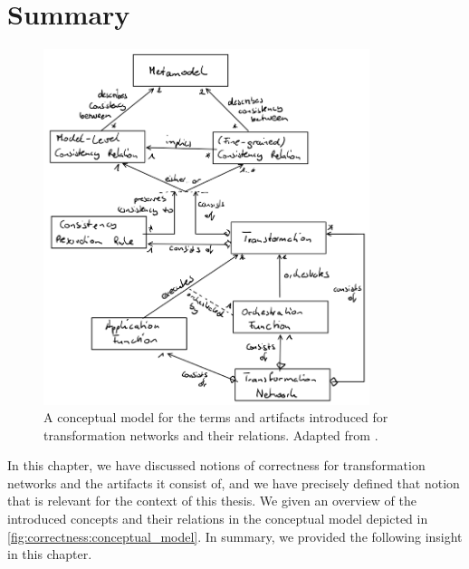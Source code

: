 \section{Summary}
\label{chap:correctness:summary}


\begin{figure}
    \centering
    \includegraphics[width=0.85\textwidth]{figures/correctness/notion/conceptual_model.png}
    \caption[Conceptual model for transformation networks]{A conceptual model for the terms and artifacts introduced for transformation networks and their relations. Adapted from .}
    \label{fig:correctness:conceptual_model}
\end{figure}

In this chapter, we have discussed notions of correctness for transformation networks and the artifacts it consist of, and we have precisely defined that notion that is relevant for the context of this thesis.
We given an overview of the introduced concepts and their relations in the conceptual model depicted in \autoref{fig:correctness:conceptual_model}.
In summary, we provided the following insight in this chapter.


